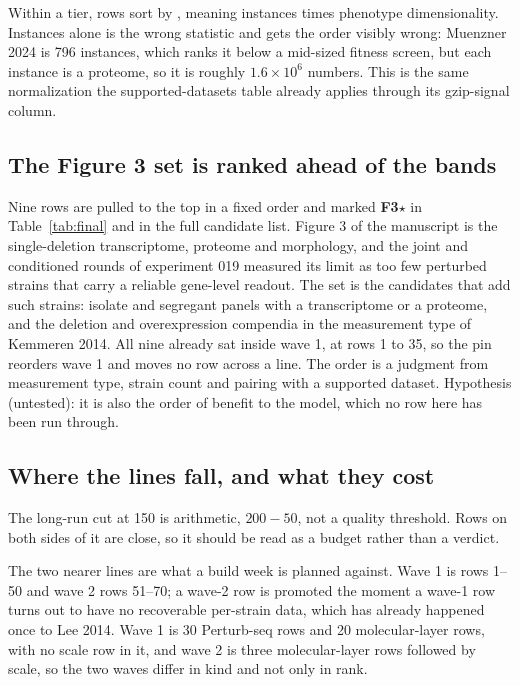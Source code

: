 Within a tier, rows sort by , meaning instances times phenotype
dimensionality. Instances alone is the wrong statistic and gets the order visibly wrong:
Muenzner 2024 is 796 instances, which ranks it below a mid-sized fitness screen, but each
instance is a proteome, so it is roughly $1.6\times10^6$ numbers. This is the same
normalization the supported-datasets table already applies through its gzip-signal column.

\subsection{The Figure 3 set is ranked ahead of the bands}\label{sec:figure3-set}

Nine rows are pulled to the top in a fixed order and marked \textbf{F3}$\star$ in
Table~\ref{tab:final} and in the full candidate list. Figure 3 of the manuscript is the
single-deletion transcriptome, proteome and morphology, and the joint and conditioned rounds
of experiment 019 measured its limit as too few perturbed strains that carry a reliable
gene-level readout. The set is the candidates that add such strains: isolate and segregant
panels with a transcriptome or a proteome, and the deletion and overexpression compendia in
the measurement type of Kemmeren 2014. All nine already sat inside wave 1, at rows 1 to 35,
so the pin reorders wave 1 and moves no row across a line. The order is a judgment from
measurement type, strain count and pairing with a supported dataset. Hypothesis (untested):
it is also the order of benefit to the model, which no row here has been run through.

\subsection{Where the lines fall, and what they cost}

The long-run cut at 150 is arithmetic, $200-50$, not a quality threshold. Rows on both
sides of it are close, so it should be read as a budget rather than a verdict.

The two nearer lines are what a build week is planned against. Wave 1 is rows 1--50 and
wave 2 rows 51--70; a wave-2 row is promoted the moment a wave-1 row turns out to have no
recoverable per-strain data, which has already happened once to Lee 2014. Wave 1 is 30
Perturb-seq rows and 20 molecular-layer rows, with no scale row in it, and wave 2 is three
molecular-layer rows followed by scale, so the two waves differ in kind and not only in
rank.

